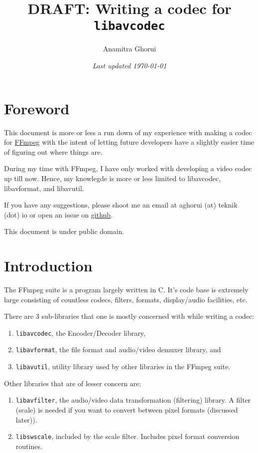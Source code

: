 \documentclass{article}
\begin{document}
\title{DRAFT: Writing a codec for \texttt{libavcodec}}
\author{Anamitra Ghorui}
\date{\emph{Last updated \today}}
\maketitle

\tableofcontents

\section{Foreword}

This document is more or less a run down of my experience with making a codec 
for \href{https://ffmpeg.org}{FFmpeg} with the intent of letting future
developers have a slightly easier time of figuring out where things are.

During my time with FFmpeg, I have only worked with developing a video codec up till now. Hence, my knowlegde is more or less limited to libavcodec, libavformat, and libavutil.

If you have any suggestions, please shoot me an email at aghorui (at) teknik (dot) io or open an issue on \href{https://github.com/daujerrine/ffmpeg-doc}{github}.

This document is under public domain.

\section{Introduction}

The FFmpeg suite is a program largely written in C. It's code base is extremely large consisting of countless codecs, filters, formats, display/audio facilities, etc.

There are 3 sub-libraries that one is mostly concerned with while writing a codec:

\begin{enumerate}
\item \texttt{libavcodec}, the Encoder/Decoder library,
\item \texttt{libavformat}, the file format and audio/video demuxer library, and
\item \texttt{libavutil}, utility library used by other libraries in the FFmpeg 
      suite.
\end{enumerate}

Other libraries that are of lesser concern are:

\begin{enumerate}
\item \texttt{libavfilter}, the audio/video data transformation (filtering) 
      library. A filter (scale) is needed if you want to convert between pixel 
      formats (discussed later)).
\item \texttt{libswscale}, included by the scale filter. Includes pixel format 
      conversion routines.
\end{enumerate}
\end{document}
